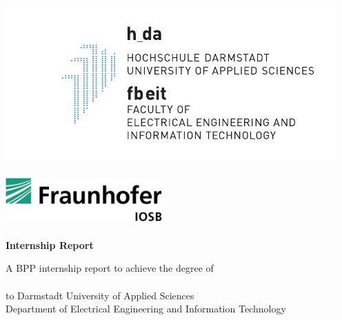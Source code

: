 
\thispagestyle{empty}
\begin{titlepage}
	\begin{flushright}
	    \includegraphics{Images/LG0_fbeit_b1169_engl-eps-converted-to.pdf}\\
	\end{flushright}
  \begin{flushright}
	    \includegraphics[width=6cm, height=2cm]{Images/LogoIOSB.jpg}\\
	\end{flushright}
    \vspace{0.3cm}
  \begin{center}
    \vspace{0.1cm}
    \huge \textbf{Internship Report}\\
  \end{center}
  \begin{center}
    \LARGE \textbf{\myTitle}
  \end{center} 
  \vfill
  \begin{center}
    \Large A BPP internship report to achieve the degree of \\
    \vspace{0.2cm}
    \Large \textit{\myDegree} \\
    \vspace{0.2cm}
		\Large to Darmstadt University of Applied Sciences\\
    \Large Department of Electrical Engineering and Information Technology
  \end{center}
  \vfill
  \begin{center}

\end{center}
\end{titlepage}
